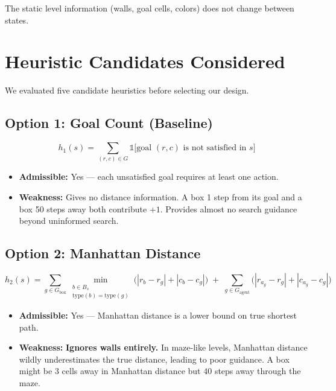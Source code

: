 \documentclass[11pt, a4paper]{article}
\begin{document}
The static level information (walls, goal cells, colors) does not change between states.

\section{Heuristic Candidates Considered}

We evaluated five candidate heuristics before selecting our design.

\subsection{Option 1: Goal Count (Baseline)}

\begin{definitionbox}
\[
    h_1(s) = \sum_{(r,c) \in G} \mathbb{1}\bigl[\text{goal } (r,c) \text{ is not satisfied in } s\bigr]
\]
\end{definitionbox}

\begin{itemize}
    \item \textbf{Admissible:} Yes --- each unsatisfied goal requires at least one action.
    \item \textbf{Weakness:} Gives no distance information. A box 1 step from its goal and a box 50 steps away both contribute $+1$. Provides almost no search guidance beyond uninformed search.
\end{itemize}

\subsection{Option 2: Manhattan Distance}

\begin{definitionbox}
\[
    h_2(s) = \sum_{g \in G_{\text{box}}} \min_{\substack{b \in B_s \\ \text{type}(b)=\text{type}(g)}} \bigl(|r_b - r_g| + |c_b - c_g|\bigr)
    \;+\; \sum_{g \in G_{\text{agent}}} \bigl(|r_{a_g} - r_g| + |c_{a_g} - c_g|\bigr)
\]
\end{definitionbox}

\begin{itemize}
    \item \textbf{Admissible:} Yes --- Manhattan distance is a lower bound on true shortest path.
    \item \textbf{Weakness:} \textbf{Ignores walls entirely.} In maze-like levels, Manhattan distance wildly underestimates the true distance, leading to poor guidance. A box might be 3 cells away in Manhattan distance but 40 steps away through the maze.
\end{itemize}
\end{document}
